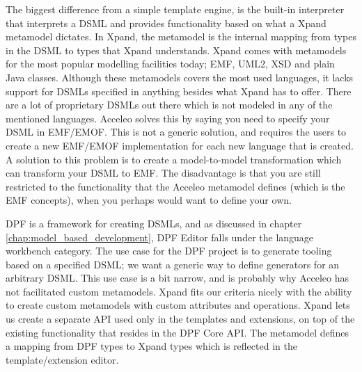 The biggest difference from a simple template engine, is the built-in interpreter that interprets a DSML and provides functionality based on what a Xpand metamodel dictates. In Xpand, the metamodel is the internal mapping from types in the DSML to types that Xpand understands. Xpand comes with metamodels for the most popular modelling facilities today; EMF, UML2, XSD and plain Java classes. Although these metamodels covers the most used languages, it lacks support for DSMLs specified in anything besides what Xpand has to offer. There are a lot of proprietary DSMLs out there which is not modeled in any of the mentioned languages. Acceleo solves this by saying you need to specify your DSML in EMF/EMOF. This is not a generic solution, and requires the users to create a new EMF/EMOF implementation for each new language that is created. A solution to this problem is to create a model-to-model transformation which can transform your DSML to EMF. The disadvantage is that you are still restricted to the functionality that the Acceleo metamodel defines (which is the EMF concepts), when you perhaps would want to define your own.

DPF is a framework for creating DSMLs, and as discussed in chapter \ref{chap:model_based_development}, DPF Editor falls under the language workbench category. The use case for the DPF project is to generate tooling based on a specified DSML; we want a generic way to define generators for an arbitrary DSML. This use case is a bit narrow, and is probably why Acceleo has not facilitated custom metamodels. Xpand fits our criteria nicely with the ability to create custom metamodels with custom attributes and operations. Xpand lets us create a separate API used only in the templates and extensions, on top of the existing functionality that resides in the DPF Core API. The metamodel defines a mapping from DPF types to Xpand types which is reflected in the template/extension editor. 

